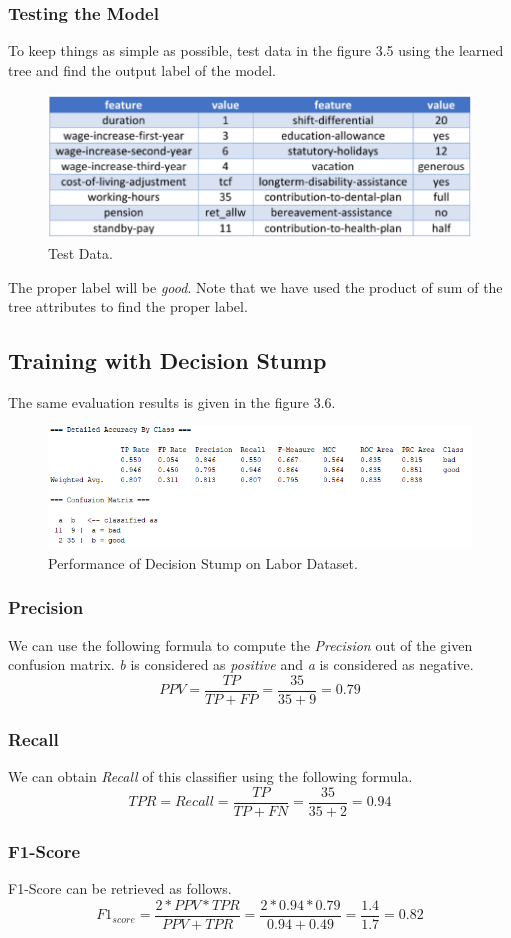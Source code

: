 \documentclass[12pt]{article}
\numberwithin{equation}{section}
\numberwithin{table}{section}
\numberwithin{figure}{section}
\begin{document}
\subsubsection{Testing the Model}
To keep things as simple as possible, test data in the figure 3.5 using the learned tree and find the output label of the model.
\begin{figure}[!h]
	\centering
	\includegraphics[scale=0.8]{2_5.png}
	\caption{Test Data.}
	\label{fig:PropProf}
\end{figure}

The proper label will be \textit{good}. Note that we have used the product of sum of the tree attributes to find the proper label.

\subsection{Training with Decision Stump}
The same evaluation results is given in the figure 3.6.

\begin{figure}[!h]
	\centering
	\includegraphics[scale=1]{2_6.png}
	\caption{Performance of Decision Stump on Labor Dataset.}
	\label{fig:PropProf}
\end{figure}

\subsubsection{Precision}
We can use the following formula to compute the \textit{Precision} out of the given confusion matrix. \textit{b} is considered as \textit{positive} and \textit{a} is considered as negative.
$$
PPV = \frac{TP}{TP + FP} = \frac{35}{35 + 9} = 0.79
$$

\subsubsection{Recall}
We can obtain \textit{Recall} of this classifier using the following formula.
$$
TPR = Recall = \frac{TP}{TP + FN} = \frac{35}{35 + 2} = 0.94
$$

\subsubsection{F1-Score}
F1-Score can be retrieved as follows. 
$$
F1_{score} = \frac{2 * PPV * TPR}{PPV + TPR} = \frac{2 * 0.94 * 0.79}{0.94 + 0.49} = \frac{1.4}{1.7} = 0.82
$$
\end{document}
